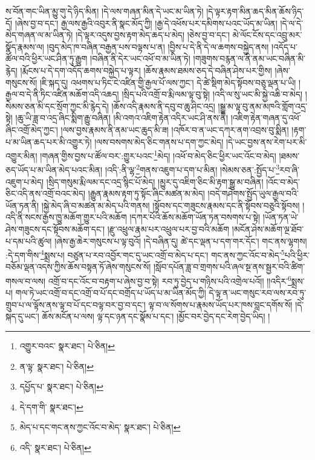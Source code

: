 ས་བོན་གང་ཡིན་མྱུ་གུ་དེ་ཉིད་མིན། །དེ་ལས་གཞན་མིན་དེ་ཡང་མ་ཡིན་ཏེ། །དེ་ལྟར་རྟག་མིན་ཆད་མིན་ཆོས་ཉིད་དོ། །ཞེས་བྱ་བ་དང་། རྒྱ་ལས་རྒྱའི་འབུར་ནི་སྣང་མོད་ཀྱི། །རྒྱ་དེ་འཕོས་པར་དམིགས་པའང་ཡོད་མ་ཡིན། །དེ་ལ་དེ་མེད་གཞན་ལ་མ་ཡིན་ཏེ། །དེ་ལྟར་འདུས་བྱས་རྟག་མེད་ཆད་པ་མེད། །ཅེས་བྱ་བ་དང་། མེ་ལོང་ངོས་དང་འབྲུ་མར་སྣོད་རྣམས་ལ། །བུད་མེད་ཁ་བཞིན་བརྒྱན་པས་བལྟས་པ་ན། །བྱིས་པ་དེ་ནི་དེ་ལ་ཆགས་བསྐྱེད་ནས། །འདོད་པ་ཚོལ་བའི་ཕྱིར་ཡང་ཤིན་ཏུ་རྒྱུག །བཞིན་ནི་དེར་ཡང་འཕོ་བ་མ་ཡིན་ཏེ། །གཟུགས་བརྙན་ལ་ནི་ནམ་ཡང་བཞིན་མི་རྙེད། །རྨོངས་པ་དེ་དག་འདོད་ཆགས་བསྐྱེད་པ་ལྟར། །ཆོས་རྣམས་ཐམས་ཅད་དེ་བཞིན་ཤེས་པར་གྱིས། །ཞེས་གསུངས་སོ། །ཇི་སྐད་དུ། འཕགས་པ་ཏིང་ངེ་འཛིན་གྱི་རྒྱལ་པོ་ལས་ཀྱང་། དེ་ཚེ་སྡིག་མེད་སྟོབས་བཅུ་ལྡན་པ་ཡི། །རྒྱལ་བ་དེ་ནི་ཏིང་འཛིན་མཆོག་འདི་འཆད། །སྲིད་པའི་འགྲོ་བ་རྨི་ལམ་ལྟ་བུ་སྟེ། །འདི་ལ་སུ་ཡང་མི་སྐྱེ་འཆི་བ་མེད། །སེམས་ཅན་མི་དང་སྲོག་ཀྱང་མི་རྙེད་དེ། །ཆོས་འདི་རྣམས་ནི་དབུ་བ་ཆུ་ཤིང་འདྲ། །སྒྱུ་མ་ལྟ་བུ་ནམ་མཁའི་གློག་འདྲ་སྟེ། །ཆུ་ཡི་ཟླ་བ་འདྲ་ཞིང་སྨིག་རྒྱུ་བཞིན། །མི་འགའ་འཇིག་རྟེན་འདིར་ཡང་ཤི་ནས་ནི། །འཇིག་རྟེན་གཞན་དུ་འཕོ་ཞིང་འགྲོ་མེད་ཀྱང་། །ལས་བྱས་རྣམས་ནི་ནམ་ཡང་ཆུད་མི་ཟ། །འཁོར་བ་ན་ཡང་དཀར་ནག་འབྲས་བུ་སྨིན། །རྟག་པ་མ་ཡིན་ཆད་པར་མི་འགྱུར་ཏེ། །ལས་བསགས་མེད་ཅིང་གནས་པ་དག་ཀྱང་མེད། །དེ་ཡང་བྱས་ནས་རེག་པར་མི་འགྱུར་མིན། །གཞན་གྱིས་བྱས་པ་ཚོལ་བར་:གྱུར་པའང་\footnote{འགྱུར་བའང་  སྣར་ཐང་།  པེ་ཅིན། }མེད། །འཕོ་བ་མེད་ཅིང་ཕྱིར་ཡང་འོང་བ་མེད། །ཐམས་ཅད་ཡོད་པ་མ་ཡིན་མེད་པའང་མིན། །འདི་:ནི་ལྷ་\footnote{ན་ལྟ་  སྣར་ཐང་།  པེ་ཅིན། }གནས་འཇུག་པ་དག་པ་མིན། །སེམས་ཅན་:སྤྱོད་པ་\footnote{དཔྱོད་པ་  སྣར་ཐང་།  པེ་ཅིན། }རབ་ཞི་འཇུག་པ་མེད། །སྲིད་གསུམ་རྨི་ལམ་དང་འདྲ་སྙིང་པོ་མེད། །མྱུར་དུ་འཇིག་ཅིང་མི་རྟག་སྒྱུ་མ་བཞིན། །འོང་བ་མེད་ཅིང་འདི་ནས་འགྲོ་བའང་མེད། །རྒྱུན་རྣམས་རྟག་ཏུ་སྟོང་ཞིང་མཚན་མ་མེད། །བདེ་གཤེགས་སྤྱོད་ཡུལ་རྒྱལ་བའི་ཡོན་ཏན་ནི། །སྐྱེ་མེད་ཞི་བ་མཚན་མ་མེད་པའི་གནས། །སྟོབས་དང་གཟུངས་རྣམས་དང་ནི་སྟོབས་བཅུའི་སྟོབས། །འདི་ནི་སངས་རྒྱས་ཁྱུ་མཆོག་གྱུར་པའི་མཆོག །དཀར་པོའི་ཆོས་མཆོག་ཡོན་ཏན་བསགས་པ་སྟེ། །ཡོན་ཏན་ཡེ་ཤེས་གཟུངས་དང་སྟོབས་མཆོག་དང་། །རྫུ་འཕྲུལ་རྣམ་པར་འཕྲུལ་པར་བྱ་བའི་མཆོག །མངོན་ཤེས་མཆོག་ལྔ་ཐོབ་པ་དམ་པའི་ཚུལ། །ཞེས་རྒྱ་ཆེར་གསུངས་པ་ལྟ་བུའོ། །དེ་བཞིན་དུ། ཚེ་དང་ལྡན་པ་དག་གར་དོང་། གང་ནས་ལྷགས། :དེ་དག་གིས་\footnote{དེ་དག་གི་  སྣར་ཐང་། }སྨྲས་པ། བཙུན་པ་རབ་འབྱོར་གང་དུ་ཡང་འགྲོ་བ་མེད་པ་དང་། གང་ནས་ཀྱང་འོང་བ་མེད་\footnote{མེད་པ་དང་གང་ནས་ཀྱང་འོང་བ་མེད་  སྣར་ཐང་།  པེ་ཅིན། }པའི་ཕྱིར་བཅོམ་ལྡན་འདས་ཀྱིས་ཆོས་བསྟན་ཏོ་ཞེས་གསུངས་སོ། །སློབ་དཔོན་ཟླ་བ་གྲགས་པའི་ཞལ་སྔ་ནས་སྦྱར་བའི་ཚིག་གསལ་བ་ལས། འགྲོ་བ་དང་འོང་བ་བརྟག་པ་ཞེས་བྱ་བ་སྟེ། རབ་ཏུ་བྱེད་པ་གཉིས་པའི་འགྲེལ་པའོ།། །།འདིར་\footnote{འདི་  སྣར་ཐང་།  པེ་ཅིན། }སྨྲས་པ། གལ་ཏེ་ཡང་འགྲོ་བ་དང་འགྲོ་བ་པོ་དང་བགྲོད་པ་ཡོད་པ་མ་ཡིན་མོད་ཀྱི། དེ་ལྟ་ན་ཡང་གསུང་རབ་ལས་རབ་ཏུ་གྲུབ་པ་ལ་ལྟོས་ནས་ལྟ་བ་པོ་དང་བལྟ་བར་བྱ་བ་དང་། ལྟ་བ་ལ་སོགས་པ་རྣམས་ཡོད་པར་ཁས་བླང་དགོས་སོ། །དེ་སྐད་དུ་ཡང་། ཆོས་མངོན་པ་ལས། ལྟ་དང་ཉན་དང་སྣོམ་པ་དང་། །མྱོང་བར་བྱེད་དང་རེག་བྱེད་ཡིད། །
